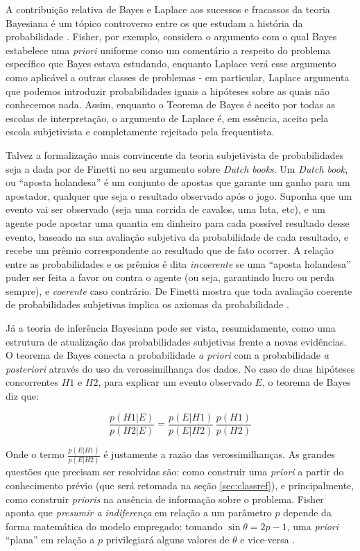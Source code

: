 A contribuição relativa de Bayes e Laplace aos sucessos
e fracassos da teoria Bayesiana é um tópico controverso	entre os que estudam a história da probabilidade \citep{Zabell09}.
Fisher, por exemplo, considera o argumento com o qual Bayes estabelece uma {\em priori} uniforme como um comentário
a respeito do problema específico que Bayes estava estudando, enquanto Laplace verá esse argumento
como aplicável a outras classes de problemas \cite{Laplace1814} - em particular, Laplace argumenta que podemos
introduzir probabilidades iguais a hipóteses sobre as quais não conhecemos nada. 
Assim, enquanto o Teorema de Bayes é aceito por todas as escolas de interpretação, o argumento de Laplace
é, em essência, aceito pela escola subjetivista \citep{Aldrich08} e completamente
rejeitado pela frequentista. 

Talvez a formalização mais convincente da teoria subjetivista de probabilidades seja a dada por de Finetti no seu argumento sobre
{\em Dutch books}. Um {\em Dutch book}, ou ``aposta holandesa'' 
é um conjunto de apostas que garante um ganho para um apostador, qualquer que seja o
resultado observado após o jogo. Suponha que um evento vai ser observado (seja uma corrida de cavalos, uma luta, etc), e um
agente pode apostar uma quantia em dinheiro para cada possível resultado desse evento, baseado na sua avaliação subjetiva da
probabilidade de cada resultado, e recebe um prêmio correspondente ao resultado que de fato ocorrer. A relação entre as 
probabilidades e os prêmios é dita {\em incoerente} se uma ``aposta holandesa'' puder ser feita a favor ou contra o agente
(ou seja, garantindo lucro ou perda sempre), e {\em coerente} caso contrário. De Finetti mostra que toda avaliação 
coerente de probabilidades subjetivas implica os axiomas da probabilidade \citep{deFinetti37}.

Já a teoria de inferência Bayesiana pode ser vista, resumidamente, como uma estrutura de atualização das probabilidades subjetivas
frente a novas evidências. O teorema de Bayes conecta a probabilidade {\em a priori} com a probabilidade {\em a posteriori}
através do uso da verossimilhança dos dados. No caso de duas hipóteses concorrentes $H1$ e $H2$, para explicar um evento observado
$E$, o teorema de Bayes diz que:

\begin{equation}
	\frac{p(H1|E)}{p(H2|E)}= \frac{p(E|H1)}{p(E|H2)} \,\frac{p(H1)}{p(H2)}
\end{equation}

Onde o termo $\frac{p(E|H1)}{p(E|H2)}$ é justamente a razão das verossimilhanças.
As grandes questões que precisam ser resolvidas são: como construir uma {\em priori}
a partir do conhecimento prévio (que será retomada na seção \ref{sec:classref}), e principalmente, como construir {\em prioris}
na ausência de informação sobre o problema. Fisher aponta que {\em presumir a indiferença} em relação a um parâmetro
$p$ depende da forma matemática do modelo empregado: tomando $\sin \theta = 2p-1$, uma {\em priori} ``plana'' em relação a $p$ 
privilegiará alguns valores de $\theta$ e vice-versa \citep{Fisher1922}.

